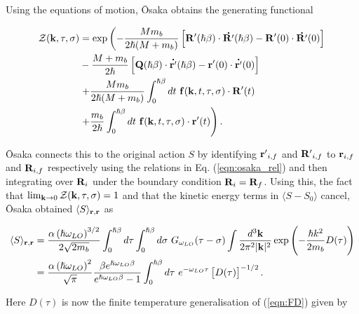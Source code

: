 Using the equations of motion, \=Osaka obtains the generating functional

\begin{equation}
    \begin{aligned}
        \mathcal{Z}(\vb{k}, \tau, \sigma) &= \exp \left(  -\frac{M m_b}{2\hslash (M + m_b)} \left[ \vb{R'}(\hslash\beta) \cdot \vb{\dot{R'}}(\hslash\beta) - \vb{R'}(0) \cdot \vb{\dot{R'}}(0) \right] \right. \\ 
        &- \frac{M + m_b}{2\hslash}  \left[ \vb{Q}(\hslash\beta) \cdot \vb{\dot{r'}}(\hslash\beta) - \vb{r'}(0) \cdot \vb{\dot{r'}}(0) \right] \\
        &\left. + \frac{M m_b}{2 \hslash (M + m_b)} \int_0^{\hslash\beta} dt\ \vb{f}(\vb{k}, t, \tau, \sigma) \cdot \vb{R'}(t) \right. \\
        &\left. + \frac{m_b}{2 \hslash} \int_0^{\hslash\beta} dt\ \vb{f}(\vb{k}, t, \tau, \sigma) \cdot \vb{r'}(t) \right).
    \end{aligned}
\end{equation}

\=Osaka connects this to the original action $S$ by identifying $\vb{r'}_{i,f}$ and $\vb{R'}_{i,f}$ to $\vb{r}_{i,f}$ and $\vb{R}_{i,f}$ respectively using the relations in Eq. (\ref{eqn:osaka_rel}) and then integrating over $\vb{R}_i$ under the boundary condition $\vb{R}_i = \vb{R}_f$. Using this, the fact that $\lim_{\vb{k}\to 0} \mathcal{Z}(\vb{k}, \tau, \sigma) = 1$ and that the kinetic energy terms in $\langle S - S_0 \rangle$ cancel, \=Osaka obtained $\langle S \rangle_{\vb{r}, \vb{r}}$ as

\begin{equation}
    \begin{aligned}
        \langle S \rangle_{\vb{r}, \vb{r}} &= \frac{\alpha \left(\hslash \omega_{LO}\right)^{3/2}}{2\sqrt{2 m_b}} \int^{\hslash\beta}_0 d\tau \int^{\hslash\beta}_0 d\sigma\ G_{\omega_{LO}}(\tau - \sigma) \int \frac{d^3\vb{k}}{2\pi^2|\vb{k}|^2} \exp \left(-\frac{\hslash k^2}{2m_b} D(\tau)\right) \\
        &= \frac{\alpha \left( \hslash \omega_{LO}\right)^{2}}{\sqrt{\pi}} \frac{\beta e^{\hslash\omega_{LO}\beta}}{e^{\hslash\omega_{LO}\beta} - 1} \int^{\hslash\beta}_0 d\tau\ e^{-\omega_{LO}\tau} \left[D(\tau) \right]^{-1/2}.
    \end{aligned}
\end{equation}

Here $D(\tau)$ is now the finite temperature generalisation of (\ref{eqn:FD}) given by

